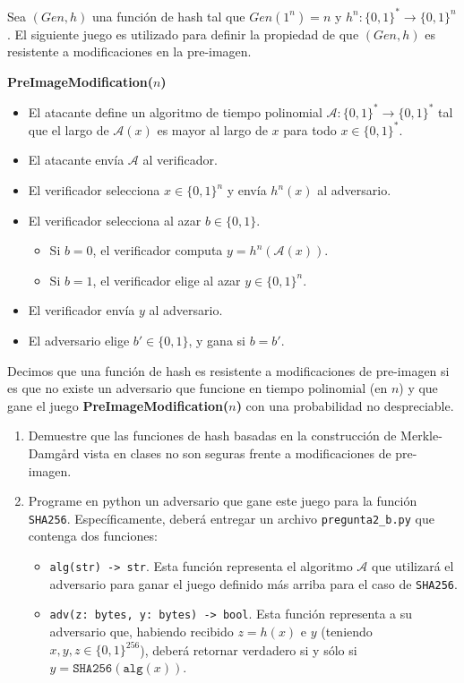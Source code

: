
Sea $(\textit{Gen}, h)$ una función de hash tal que $\textit{Gen}(1^n) = n$ y  $h^n : \{0,1\}^* \to \{0,1\}^n$. El siguiente juego es utilizado para definir la propiedad de que $(\textit{Gen}, h)$ es resistente a modificaciones en la pre-imagen.

{\bf PreImageModification($n$)}
\begin{itemize}
\item El atacante define un algoritmo de tiempo polinomial $\mathcal{A}:\{0,1\}^*\rightarrow\{0,1\}^*$ tal que el largo de $\mathcal{A}(x)$ es mayor al largo de $x$ para todo $x\in\{0,1\}^*$.
\item El atacante envía $\mathcal{A}$ al verificador.
\item El verificador selecciona $x\in\{0, 1\}^n$ y envía $h^n(x)$ al adversario.
\item El verificador selecciona al azar $b\in\{0, 1\}$.
\begin{itemize}
\item Si $b=0$, el verificador computa $y=h^n(\mathcal{A}(x))$.
\item Si $b=1$, el verificador elige al azar $y\in\{0,1\}^n$.
\end{itemize}
\item El verificador envía $y$ al adversario.
\item El adversario elige $b'\in\{0,1\}$, y gana si $b=b'$.
\end{itemize}
Decimos que una función de hash es resistente a modificaciones de pre-imagen si es que no existe un adversario que funcione en tiempo polinomial (en $n$) y que gane el juego {\bf PreImageModification($n$)} con una probabilidad no despreciable.
\begin{enumerate}
\item Demuestre que las funciones de hash basadas en la construcción de Merkle-Damgård vista en clases no son seguras frente a modificaciones de pre-imagen.

\item Programe en python un adversario que gane este juego para la función \texttt{SHA256}. Específicamente, deberá entregar un archivo \texttt{pregunta2\_b.py} que contenga dos funciones:
\begin{itemize}
\item \texttt{alg(str) -> str}. Esta función representa el algoritmo $\mathcal{A}$ que utilizará el adversario para ganar el juego definido más arriba para el caso de \texttt{SHA256}.
\item \texttt{adv(z: bytes, y: bytes) -> bool}. Esta función representa a su adversario que, habiendo recibido $z=h(x)$ e $y$ (teniendo $x,y,z\in\{0,1\}^{256}$), deberá retornar verdadero si y sólo si $y=\texttt{SHA256}(\texttt{alg}(x))$.
\end{itemize}

\end{enumerate}

